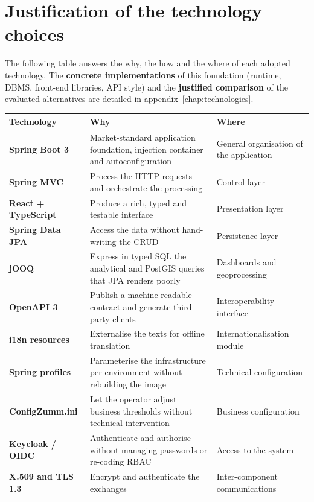 \section{Justification of the technology choices}
The following table answers the why, the how and the where of each adopted
technology. The \textbf{concrete implementations} of this foundation (runtime,
DBMS, front-end libraries, API style) and the \textbf{justified comparison} of
the evaluated alternatives are detailed in
appendix~\ref{chap:technologies}.
\begin{xltabular}{\textwidth}{>{\bfseries}p{2.6cm} X p{5.4cm}}
\toprule
\textbf{Technology} & \textbf{Why} & \textbf{Where} \\
\midrule
\endhead
Spring Boot 3 & Market-standard application foundation, injection container and autoconfiguration & General organisation of the application \\
Spring MVC & Process the HTTP requests and orchestrate the processing & Control layer \\
React + TypeScript & Produce a rich, typed and testable interface & Presentation layer \\
Spring Data JPA & Access the data without hand-writing the CRUD & Persistence layer \\
jOOQ & Express in typed SQL the analytical and PostGIS queries that JPA renders poorly & Dashboards and geoprocessing \\
OpenAPI 3 & Publish a machine-readable contract and generate third-party clients & Interoperability interface \\
i18n resources & Externalise the texts for offline translation & Internationalisation module \\
Spring profiles & Parameterise the infrastructure per environment without rebuilding the image & Technical configuration \\
ConfigZumm.ini & Let the operator adjust business thresholds without technical intervention & Business configuration \\
Keycloak / OIDC & Authenticate and authorise without managing passwords or re-coding RBAC & Access to the system \\
X.509 and TLS 1.3 & Encrypt and authenticate the exchanges & Inter-component communications \\
\bottomrule
\end{xltabular}

